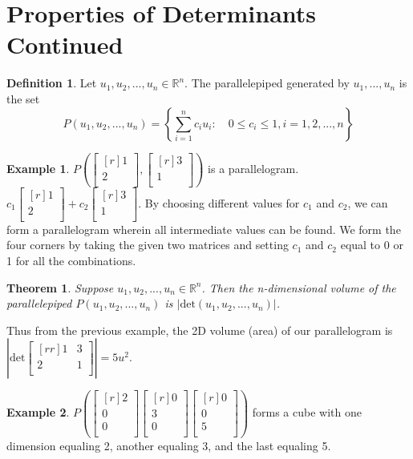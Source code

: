 \documentclass{report}
\theoremstyle{plain}
\newtheorem*{thrm}{Theorem}
\theoremstyle{definition}
\newtheorem*{ex}{Example}
\newtheorem*{defn}{Definition}
\theoremstyle{plain}
\begin{document}
\section{Properties of Determinants Continued}
\begin{defn}
Let $u_1,u_2,...,u_n\in\mathbb{R}^n$. The parallelepiped generated by $u_1,...,u_n$ is the set
\[ P(u_1,u_2,...,u_n) = \left\{\sum_{i=1}^n c_iu_i:\quad 0\leq c_i\leq 1,i=1,2,...,n\right\} \]
\end{defn}
\begin{ex}
$P(\begin{bmatrix}[r]1\\2\\\end{bmatrix},\begin{bmatrix}[r]3\\1\\\end{bmatrix})$ is a parallelogram. \\
$c_1\begin{bmatrix}[r]1\\2\\\end{bmatrix}+c_2\begin{bmatrix}[r]3\\1\\\end{bmatrix}$. By choosing different values for $c_1$ and $c_2$, we can form a parallelogram wherein all intermediate values can be found. We form the four corners by taking the given two matrices and setting $c_1$ and $c_2$ equal to 0 or 1 for all the combinations.
\end{ex}
\begin{thrm}
Suppose $u_1,u_2,...,u_n\in\mathbb{R}^n$. Then the n-dimensional volume of the parallelepiped $P(u_1,u_2,...,u_n)$ is $|\mathrm{det}(u_1,u_2,...,u_n)|$.
\end{thrm}
Thus from the previous example, the 2D volume (area) of our parallelogram is $\left |\mathrm{det}\begin{bmatrix}[rr]1&3\\2&1\\\end{bmatrix}\right |=5u^2$.\\
\begin{ex}
$P\left (\begin{bmatrix}[r]2\\0\\0\\\end{bmatrix}\begin{bmatrix}[r]0\\3\\0\\\end{bmatrix}\begin{bmatrix}[r]0\\0\\5\\\end{bmatrix}\right )$ forms a cube with one dimension equaling 2, another equaling 3, and the last equaling 5. \\
\end{ex}
\end{document}
